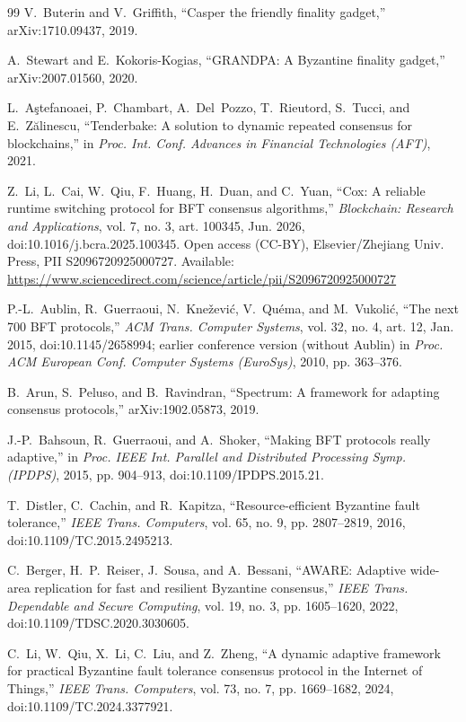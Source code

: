 \documentclass[journal]{IEEEtran}
\theoremstyle{definition}
\theoremstyle{remark}
\begin{document}
\begin{thebibliography}{99}
 V.~Buterin and V.~Griffith, ``Casper the friendly finality gadget,''
arXiv:1710.09437, 2019.

 A.~Stewart and E.~Kokoris-Kogias, ``GRANDPA: A Byzantine finality gadget,''
arXiv:2007.01560, 2020.

 L.~A\c{s}tefanoaei, P.~Chambart, A.~Del~Pozzo, T.~Rieutord, S.~Tucci, and
E.~Z\u{a}linescu, ``Tenderbake: A solution to dynamic repeated consensus for blockchains,'' in
\emph{Proc. Int. Conf. Advances in Financial Technologies (AFT)}, 2021.

 Z.~Li, L.~Cai, W.~Qiu, F.~Huang, H.~Duan, and C.~Yuan, ``Cox: A reliable runtime
switching protocol for BFT consensus algorithms,'' \emph{Blockchain: Research and Applications},
vol. 7, no. 3, art. 100345, Jun. 2026, doi:10.1016/j.bcra.2025.100345. Open access (CC-BY),
Elsevier/Zhejiang Univ. Press, PII S2096720925000727. Available:
\url{https://www.sciencedirect.com/science/article/pii/S2096720925000727}

 P.-L.~Aublin, R.~Guerraoui, N.~Knežević, V.~Quéma, and M.~Vukolić, ``The next
700 BFT protocols,'' \emph{ACM Trans. Computer Systems}, vol. 32, no. 4, art. 12, Jan. 2015,
doi:10.1145/2658994; earlier conference version (without Aublin) in \emph{Proc. ACM European Conf.
Computer Systems (EuroSys)}, 2010, pp. 363--376.

 B.~Arun, S.~Peluso, and B.~Ravindran, ``Spectrum: A framework for adapting
consensus protocols,'' arXiv:1902.05873, 2019.

 J.-P.~Bahsoun, R.~Guerraoui, and A.~Shoker, ``Making BFT protocols really
adaptive,'' in \emph{Proc. IEEE Int. Parallel and Distributed Processing Symp. (IPDPS)}, 2015,
pp. 904--913, doi:10.1109/IPDPS.2015.21.

 T.~Distler, C.~Cachin, and R.~Kapitza, ``Resource-efficient Byzantine fault
tolerance,'' \emph{IEEE Trans. Computers}, vol. 65, no. 9, pp. 2807--2819, 2016,
doi:10.1109/TC.2015.2495213.

 C.~Berger, H.~P.~Reiser, J.~Sousa, and A.~Bessani, ``AWARE: Adaptive wide-area
replication for fast and resilient Byzantine consensus,'' \emph{IEEE Trans. Dependable and Secure
Computing}, vol. 19, no. 3, pp. 1605--1620, 2022, doi:10.1109/TDSC.2020.3030605.

 C.~Li, W.~Qiu, X.~Li, C.~Liu, and Z.~Zheng, ``A dynamic adaptive framework for
practical Byzantine fault tolerance consensus protocol in the Internet of Things,'' \emph{IEEE
Trans. Computers}, vol. 73, no. 7, pp. 1669--1682, 2024, doi:10.1109/TC.2024.3377921.


\end{thebibliography}
\end{document}
